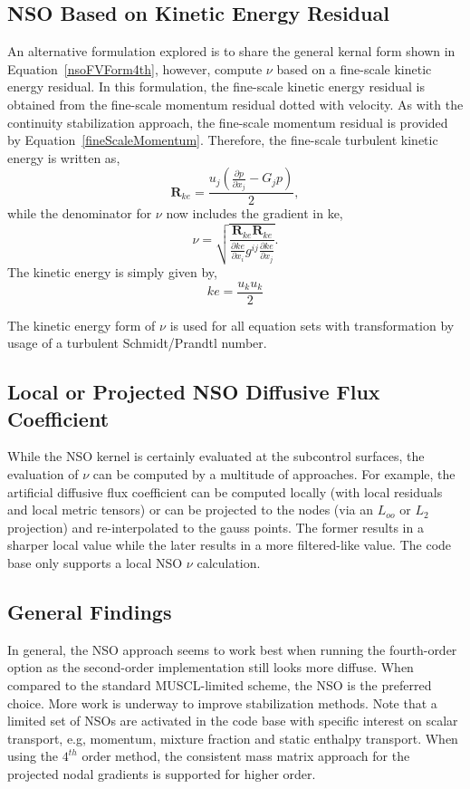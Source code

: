 \subsection{NSO Based on Kinetic Energy Residual}
An alternative formulation explored is to share the general kernal form shown in Equation~\ref{nsoFVForm4th},
however, compute $\nu$ based on a fine-scale kinetic energy residual. In this formulation, the fine-scale
kinetic energy residual is obtained from the fine-scale momentum residual dotted with velocity. As with the 
continuity stabilization approach, the fine-scale momentum residual is provided by Equation~\ref{fineScaleMomentum}.
Therefore, the fine-scale turbulent kinetic energy is written as,
\begin{equation}
 \mathbf{R}_{ke} = \frac{u_j(\frac{\partial p} {\partial x_j} - G_j p )}{2},
\label{fineScaleKe}
\end{equation}
while the denominator for $\nu$ now includes the gradient in ke,
\begin{equation}
  \nu = \sqrt{ \frac{\mathbf{R}_{ke} \mathbf{R}_{ke}} {\frac {\partial ke}{\partial x_i} g^{ij} \frac{\partial ke}{\partial x_j}} }.
\label{nuKe}
\end{equation}
The kinetic energy is simply given by,
\begin{equation}
  ke = \frac{u_k u_k}{2}
\label{keForm}
\end{equation}

The kinetic energy form of $\nu$ is used for all equation sets with transformation by usage of a 
turbulent Schmidt/Prandtl number.

\subsection{Local or Projected NSO Diffusive Flux Coefficient}
While the NSO kernel is certainly evaluated at the subcontrol surfaces, the evaluation of $\nu$ can be 
computed by a multitude of approaches. For example, the artificial diffusive flux coefficient 
can be computed locally (with local residuals and local metric tensors) or can be projected 
to the nodes (via an $L_{oo}$ or $L_2$ projection) and re-interpolated to the gauss points. 
The former results in a sharper local value while the later results in a more filtered-like value.
The code base only supports a local NSO $\nu$ calculation.

\subsection{General Findings}
In general, the NSO approach seems to work best when running the fourth-order option as the second-order 
implementation still looks more diffuse. When compared to the standard MUSCL-limited scheme, the NSO
is the preferred choice. More work is underway to improve stabilization methods.
Note that a limited set of NSOs are activated in the code base with specific
interest on scalar transport, e.g, momentum, mixture fraction and static enthalpy transport. 
When using the $4^{th}$  order method, the consistent mass matrix approach for the projected 
nodal gradients is supported for higher order.
